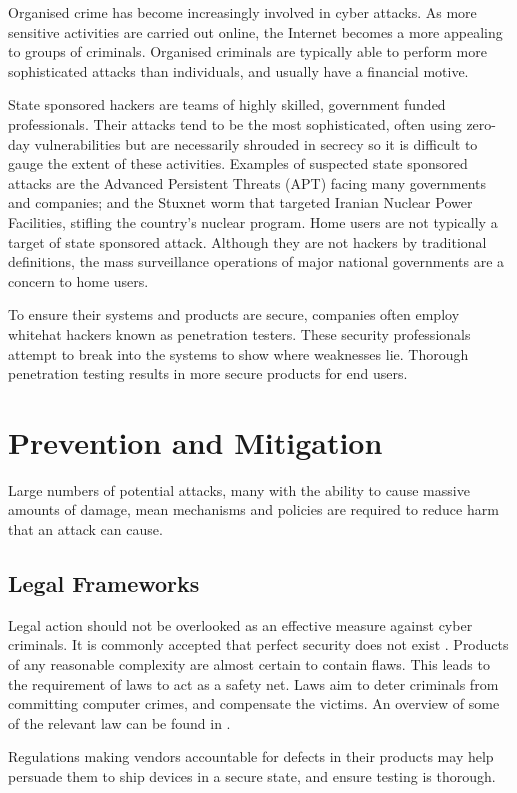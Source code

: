 \documentclass[10pt,journal,compsoc]{IEEEtran}
\begin{document}
Organised crime has become increasingly involved in cyber attacks. As more
sensitive activities are carried out online, the Internet becomes a more
appealing to groups of criminals. Organised criminals are typically able to
perform more sophisticated attacks than individuals, and usually have a
financial motive. 

State sponsored hackers are teams of highly skilled, government funded
professionals. Their attacks tend to be the most sophisticated, often using
zero-day vulnerabilities but are necessarily shrouded in secrecy so it is
difficult to gauge the extent of these activities. Examples of suspected state
sponsored attacks are the Advanced Persistent Threats (APT) facing many
governments and companies; and the Stuxnet worm that targeted Iranian Nuclear
Power Facilities, stifling the country's nuclear program. Home users are not
typically a target of state sponsored attack. Although they are not hackers by
traditional definitions, the mass surveillance operations of major national
governments are a concern to home users.  

To ensure their systems and products are secure, companies often employ
whitehat hackers known as penetration testers. These security professionals
attempt to break into the systems to show where weaknesses lie. Thorough
penetration testing results in more secure products for end users.

\section{Prevention and Mitigation}
Large numbers of potential attacks, many with the ability to cause massive
amounts of damage, mean mechanisms and policies are required to reduce harm
that an attack can cause. 

\subsection{Legal Frameworks}
Legal action should not be overlooked as an effective measure against cyber
criminals. It is commonly accepted that perfect security does not exist
\cite{ThereMustBeA}. Products of any reasonable complexity are almost certain
to contain flaws. This leads to the requirement of laws to act as a safety net.
Laws aim to deter criminals from committing computer crimes, and compensate the
victims. An overview of some of the relevant law can be found in
\cite{Weber2010}. 

Regulations making vendors accountable for defects in their products may help
persuade them to ship devices in a secure state, and ensure testing is
thorough. 
\end{document}
